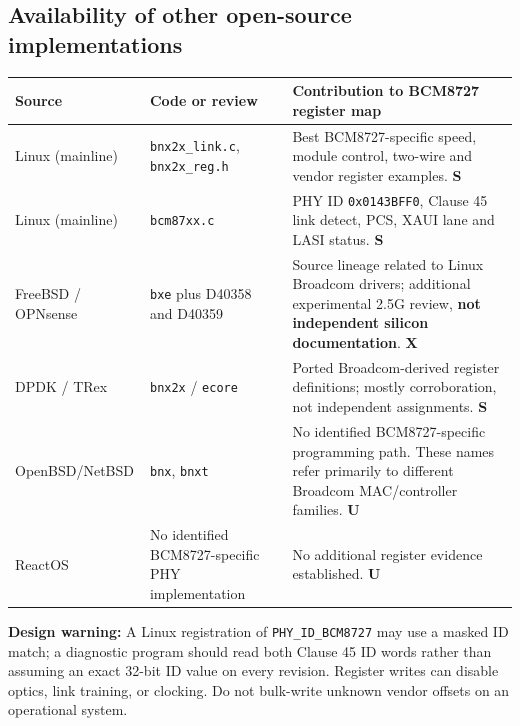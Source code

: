 \documentclass[10pt,a4paper]{article}
\newcommand{\m}[1]{\textsf{\color{blue}\bfseries #1}}
\newcommand{\unk}{\textsf{\color{amber}\bfseries U}}
\begin{document}
\subsection{Availability of other open-source implementations}
\begin{tabularx}{\linewidth}{@{}p{27mm}p{52mm}X@{}}\toprule
\textbf{Source} & \textbf{Code or review} & \textbf{Contribution to BCM8727 register map}\\\midrule
Linux (mainline) & \texttt{bnx2x\_link.c}, \texttt{bnx2x\_reg.h} & Best BCM8727-specific speed, module control, two-wire and vendor register examples. \m{S}\\
Linux (mainline) & \texttt{bcm87xx.c} & PHY ID \texttt{0x0143BFF0}, Clause 45 link detect, PCS, XAUI lane and LASI status. \m{S}\\
FreeBSD / OPNsense & \texttt{bxe} plus D40358 and D40359 & Source lineage related to Linux Broadcom drivers; additional experimental 2.5G review, \textbf{not independent silicon documentation}. \m{X}\\
DPDK / TRex & \texttt{bnx2x} / \texttt{ecore} & Ported Broadcom-derived register definitions; mostly corroboration, not independent assignments. \m{S}\\
OpenBSD/NetBSD & \texttt{bnx}, \texttt{bnxt} & No identified BCM8727-specific programming path. These names refer primarily to different Broadcom MAC/controller families. \unk{}\\
ReactOS & No identified BCM8727-specific PHY implementation & No additional register evidence established. \unk{}\\
\bottomrule\end{tabularx}

\textbf{Design warning:} A Linux registration of \texttt{PHY\_ID\_BCM8727} may use a masked ID match; a diagnostic program should read both Clause 45 ID words rather than assuming an exact 32-bit ID value on every revision. Register writes can disable optics, link training, or clocking. Do not bulk-write unknown vendor offsets on an operational system.
\end{document}
